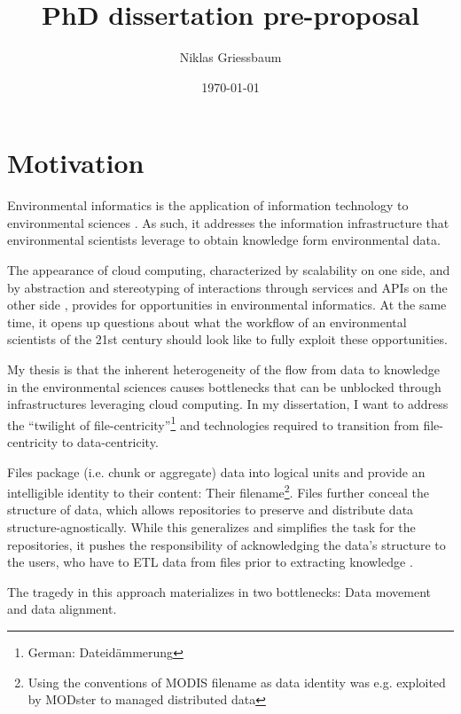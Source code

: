 \documentclass[letterpaper, parskip=half]{scrartcl}
\title{PhD dissertation pre-proposal}
\author{Niklas Griessbaum}
\date{\today}
\begin{document}
\maketitle

\tableofcontents

\newpage
\printglossaries


\newpage

\section{Motivation}

Environmental informatics is the application of information technology to environmental sciences \citep{Frew2012}.
As such, it addresses the information infrastructure that environmental scientists leverage
to obtain knowledge form environmental data.

The appearance of cloud computing, characterized by scalability on one side, 
and by abstraction and stereotyping of interactions through services and \glspl{API} on the other side \citep{Foster2017}, 
provides for opportunities in environmental informatics. 
At the same time, it opens up questions about what the workflow of an environmental scientists of the 21st century should look like to fully exploit these opportunities.

My thesis is that the inherent heterogeneity of the flow from data to knowledge in the environmental sciences causes bottlenecks that can be unblocked through infrastructures leveraging cloud computing. 
In my dissertation, I want to address the ``twilight of file-centricity''\footnote{German: Dateidämmerung } and technologies required to transition from file-centricity to data-centricity.

Files package (i.e. chunk or aggregate) data into logical units and provide an intelligible identity to their content: Their filename\footnote{Using the conventions of \gls{MODIS} filename as data identity was e.g. exploited by MODster \citep{Frew2005, Frew2002} to managed distributed data}.
Files further conceal the structure of data, which allows repositories to preserve and distribute data structure-agnostically. 
While this generalizes and simplifies the task for the repositories, it pushes the responsibility of acknowledging the data's structure to the users, who have to \gls{ETL} data from files prior to extracting knowledge \citep{Rilee2016, Szalay2009}.

The tragedy in this approach materializes in two bottlenecks: Data movement and data alignment.
\end{document}
